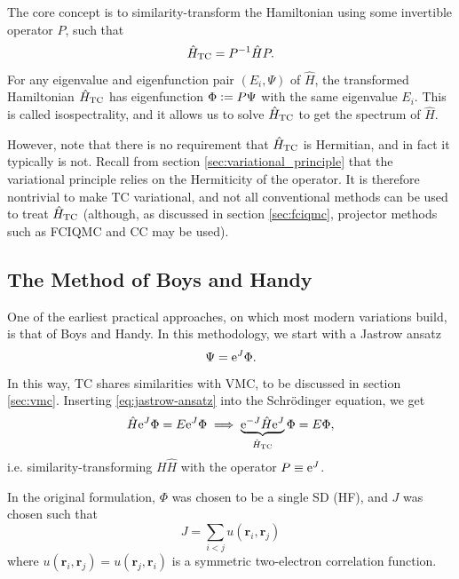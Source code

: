 The core concept is to similarity-transform the Hamiltonian using some invertible operator $P$, such that
\begin{equation}
    \hat H_\mathrm{TC} = P^{-1}\hat HP.
\end{equation}
For any eigenvalue and eigenfunction pair $(E_i,\Psi)$ of $\hat H$, the transformed Hamiltonian $\hat H_\mathrm{TC}$ has eigenfunction $\Phi\mathrel{\mathop:}= P\Psi$ with the same eigenvalue $E_i$. This is called isospectrality, and it allows us to solve $\hat H_\mathrm{TC}$ to get the spectrum of $\hat H$.

However, note that there is no requirement that $\hat H_\mathrm{TC}$ is Hermitian, and in fact it typically is not. Recall from section \ref{sec:variational_principle} that the variational principle relies on the Hermiticity of the operator. It is therefore nontrivial to make \gls{TC} variational, and not all conventional methods can be used to treat $\hat H_\mathrm{TC}$ (although, as discussed in section \ref{sec:fciqmc}, projector methods such as FCIQMC and CC may be used).

\subsection{The Method of Boys and Handy}

One of the earliest practical approaches, on which most modern variations build, is that of Boys and Handy. In this methodology, we start with a Jastrow ansatz\cite{jastrowManyBody1955}
\begin{equation}
    \label{eq:jastrow-ansatz}
    \Psi = \mathrm{e}^J\Phi.
\end{equation}
In this way, TC shares similarities with \gls{VMC}, to be discussed in section \ref{sec:vmc}. Inserting \ref{eq:jastrow-ansatz} into the Schrödinger equation, we get
\begin{equation}
    \hat H \mathrm{e}^J\Phi = E\mathrm{e}^J\Phi \implies \underbrace{\mathrm{e}^{-J}\hat H\mathrm{e}^J}_{\hat H_\mathrm{TC}}\Phi = E\Phi,
\end{equation}
i.e. similarity-transforming $H\hat H$ with the operator $P\equiv\mathrm{e}^J$.

In the original formulation, $\Phi$ was chosen to be a single \gls{SD} (\gls{HF}), and $J$ was chosen such that
\begin{equation}
    \label{eq:jastrow-two-elec}
    J = \sum_{i<j}u(\bm r_i, \bm r_j)
\end{equation}
where $u(\bm r_i, \bm r_j) = u(\bm r_j, \bm r_i)$ is a symmetric two-electron correlation function.

